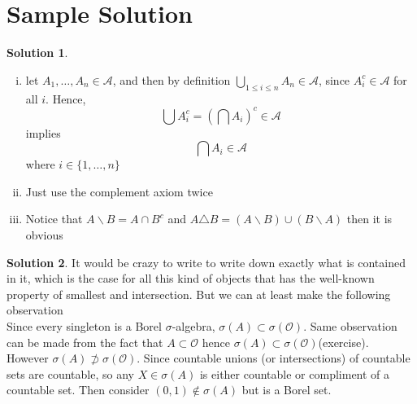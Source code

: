 \documentclass{article}
\theoremstyle{definition}
\newtheorem{solution}{Solution}
\begin{document}
\section*{Sample Solution}
\begin{solution}
	\begin{enumerate}[i)]
\item			let $A_1,\dots,A_n \in \mathscr{A}$, and then by definition $\bigcup_{1 \le i \le n} A_n \in \mathscr{A}$, since $A_i^c \in \mathscr{A} $ for all $i$. Hence,
	\begin{equation*}
		\bigcup{A_i^c} = (\bigcap{A_i})^c \in \mathscr{A}
	\end{equation*}
	implies 
	\begin{equation*}
		\bigcap{A_i} \in \mathscr{A}
	\end{equation*}
	where $i \in \{1,\dots,n\}$
\item Just use the complement axiom twice
\item Notice that $A\backslash B = A \cap B^c$ and $A \triangle B = (A \backslash B) \cup (B \backslash A)$ then it is obvious
	
\end{enumerate}	
\end{solution}
	
\vspace{1em}

\begin{solution}
	It would be crazy to write to write down exactly what is contained in it, which is the case for all this kind of objects that has the well-known property of smallest and intersection. But we can at least make the following observation \\
	Since every singleton is a Borel $\sigma$-algebra, $\sigma(A) \subset \sigma(\mathcal{O})$. Same observation can be made from the fact that $A \subset \mathcal{O}$ hence  $\sigma(A) \subset \sigma(\mathcal{O})$(exercise). \\
	However  $\sigma(A) \not \supset \sigma(\mathcal{O})$. Since countable unions (or intersections) of countable sets are countable, so any $X \in \sigma(A)$ is either countable or compliment of a countable set. Then consider $(0,1) \not \in \sigma(A)$ but is a Borel set.
\end{solution}
\end{document}
